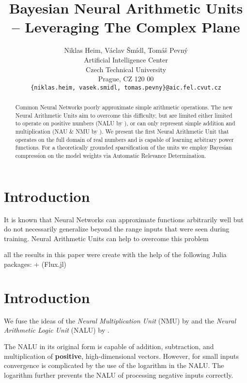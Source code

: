 \documentclass[9pt]{article}
\title{Bayesian Neural Arithmetic Units -- Leveraging The Complex Plane}
\author{
  Niklas Heim,
  V\'aclav \v Sm\'idl,
  Tom\'a\v s Pevn\'y \\
  Artificial Intelligence Center\\
  Czech Technical University\\
  Prague, CZ 120 00\\
  \texttt{\{niklas.heim, vasek.smidl, tomas.pevny\}@aic.fel.cvut.cz}\\
}
\begin{document}
\maketitle

\begin{abstract}
  Common Neural Networks poorly approximate simple arithmetic operations.  The
  new Neural Arithmetic Units aim to overcome this difficulty, but are limited
  either limited to operate on positive numbers (NALU by
  \citet{trask_neural_2018}), or can only represent simple addition and
  multiplication (NAU \& NMU by \citet{madsen_neural_2020}).
  We present the first Neural Arithmetic Unit that operates on the full domain
  of real numbers and is capable of learning arbitrary power functions.
  For a theoretically grounded sparsification of the units we employ Bayesian
  compression on the model weights via Automatic Relevance Determination.
\end{abstract}

\section{Introduction}%
\label{sec:introduction}

It is known that Neural Networks can approximate functions arbitrarily well but
do not necessarily generalize beyond the range inputs that were seen during
training. Neural Arithmetic Units can help to overcome this problem
\cite{trask_neural_2018,madsen_neural_2020}

all the results in this paper were create with the help of the following Julia
packages: \cite{rackauckas_differentialequationsjl_2017} + (Flux.jl)


\section{Introduction}%
\label{sec:introduction}

We fuse the ideas of the \emph{Neural Multiplication Unit} (NMU) by
\citet{madsen_neural_2020} and the \emph{Neural Arithmetic Logic Unit} (NALU)
by \citet{trask_neural_2018}.

The NALU in its original form is capable of addition, subtraction, and
multiplication of \textbf{positive}, high-dimensional vectors. However, for
small inputs convergence is complicated by the use of the logarithm in the
NALU. The logarithm further prevents the NALU of processing negative inputs
correctly.
\end{document}
